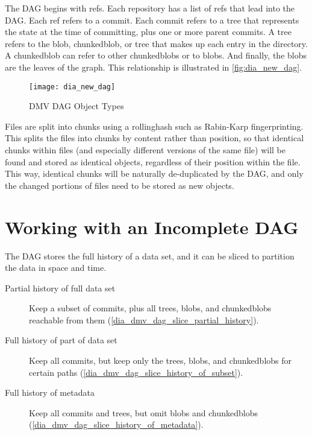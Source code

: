 
The \gls{DAG} begins with \glspl{ref}. Each repository has a list of \glspl{ref}
that lead into the \gls{DAG}. Each \gls{ref} refers to a \gls{commit}. Each
\gls{commit} refers to a \gls{tree} that represents the state at the time of
committing, plus one or more parent \glspl{commit}. A \gls{tree} refers to the
\gls{blob}, \gls{chunkedblob}, or \gls{tree} that makes up each entry in the
directory. A \gls{chunkedblob} can refer to other \glspl{chunkedblob} or to
\glspl{blob}. And finally, the \glspl{blob} are the leaves of the graph. This
relationship is illustrated in \autoref{fig:dia_new_dag}.

\begin{figure}[]
    \centering
        \texttt{[image: dia\_new\_dag]}
    \caption{DMV DAG Object Types}
    \label{fig:dia_new_dag}
\end{figure}


Files are split into chunks using a \gls{rollinghash} such as Rabin-Karp
fingerprinting\cite{rabin_karp_fingerprinting}. This splits the files into
chunks by content rather than position, so that identical chunks within files
(and especially different versions of the same file) will be found and stored as
identical objects, regardless of their position within the file. This way,
identical chunks will be naturally de-duplicated by the \gls{DAG}, and only the
changed portions of files need to be stored as new objects.

%


\section{Working with an Incomplete DAG}

The \gls{DAG} stores the full history of a data set, and it can be sliced to
partition the data in space and time.

\begin{description}

    \item[Partial history of full data set] Keep a subset of \glspl{commit},
        plus all \glspl{tree}, \glspl{blob}, and \glspl{chunkedblob} reachable
        from them (\autoref{dia_dmv_dag_slice_partial_history}).

    \item[Full history of part of data set] Keep all \glspl{commit}, but keep
        only the \glspl{tree}, \glspl{blob}, and \glspl{chunkedblob} for certain
        paths (\autoref{dia_dmv_dag_slice_history_of_subset}).

    \item[Full history of metadata] Keep all \glspl{commit} and \glspl{tree},
        but omit \glspl{blob} and \glspl{chunkedblob}
        (\autoref{dia_dmv_dag_slice_history_of_metadata}).

\end{description}

